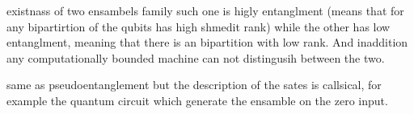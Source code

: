 \documentclass[manuscript,screen,review]{acmart}
\begin{document}
\begin{definition}[pseudoentanglement]
  existnass of two ensambels family such one is higly entanglment (means that
  for any bipartirtion of the qubits has high shmedit rank) while the other has
  low entanglment, meaning that there is an bipartition with low rank. And
  inaddition any computationally bounded machine can  not distingusih between
  the two.
\end{definition}

\begin{definition}
  same as pseudoentanglement but the description of the sates is callsical, for
  example the quantum circuit which generate the ensamble on the zero input.
\end{definition}

\printbibliography
\end{document}
